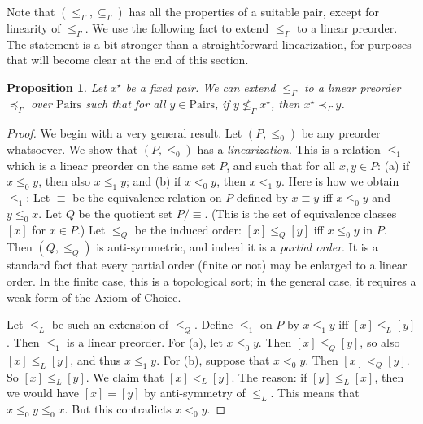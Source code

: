 \documentclass[letterpaper]{article}
\newtheorem{proposition}[theorem]{Proposition}
\theoremstyle{definition}
\newcommand{\Pairs}{\mbox{Pairs}}
\newcommand{\provsub}{\subseteq_{\Gamma}}
\newcommand{\provle}{\le_{\Gamma}}
\newcommand{\provextended}{\preceq_{\Gamma}}
\newcommand{\provextendedstrict}{\prec_{\Gamma}}
\begin{document}
Note that $(\provle, \provsub)$ has all the properties of a suitable pair, except for linearity of $\provle$.  We use the following fact to extend $\provle$ to a linear preorder.  The statement is a bit stronger than a straightforward linearization, for purposes that will become clear at the end of this section.  %

\begin{proposition}
\label{proposition-linearization}
Let $x^\star$ be a fixed pair.  We can extend $\provle$ to a linear preorder $\provextended$ over $\Pairs$ such that for all $y \in \Pairs$, if $y \not \provle x^\star$, then $x^\star \provextendedstrict y$.
\end{proposition}
\begin{proof}
We begin with a very general result.   Let $(P,\leq_0)$ be any preorder whatsoever.
We show that $(P,\leq_0)$ has a 
 \emph{linearization}.  This is a relation $\leq_1$ which is a linear preorder on the same set $P$,
and such that for all $x,y\in P$:
(a) if $x \leq_0 y$, then also $x\leq_1 y$; and 
(b) if $x <_0 y$, then $x <_1 y$.
Here is how we obtain $\leq_1$:
Let $\equiv$ be the equivalence
relation on $P$ defined by $x \equiv y$ iff $x \leq_0 y$ and
$y\leq_0 x$. Let $Q$ be the quotient set $P/\!\equiv$.
(This is the set of equivalence classes $[x]$ for $x\in P$.)
Let $\leq_Q$ be the induced order: $[x]\leq_Q [y]$ iff $x \leq_0 y$ in $P$.  Then $(Q, \leq_Q)$ is anti-symmetric, and indeed it is a 
\emph{partial order}.  It is a standard fact that every partial order
(finite or not) may be enlarged to a linear order.
In the finite case, this is a topological sort;
in the general case, it requires a weak form of the Axiom of Choice.

Let $\leq_L$ be such an extension of $\leq_Q$.
Define $\leq_1$ on $P$ by $x \leq_1 y$ iff $[x] \leq_L [y]$.
Then $\leq_1$  is 
a linear preorder.  For (a), let  $x \leq_0 y$.
Then $[x] \leq_Q [y]$, so also $[x] \leq_L [y]$,
and thus $x\leq_1 y$.  For (b), suppose that $x <_0 y$.
Then $[x] <_Q [y]$.  So $[x] \leq_L [y]$.
We claim that $[x] <_L [y]$.  The reason:
if $[y] \leq_L [x]$, then we would have $[x] = [y]$
by anti-symmetry of $\leq_L$. 
This means that $x \leq_0 y\leq_0 x$.
But this contradicts $x <_0 y$.


\end{proof}
\end{document}
